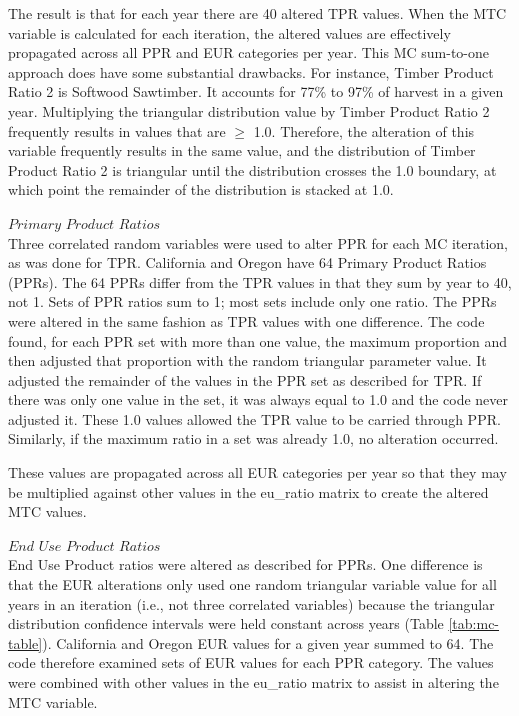 \documentclass[
  openany]{book}
\begin{document}
The result is that for each year there are 40 altered TPR values. When the MTC variable is calculated for each iteration, the altered values are effectively propagated across all PPR and EUR categories per year. This MC sum-to-one approach does have some substantial drawbacks. For instance, Timber Product Ratio 2 is Softwood Sawtimber. It accounts for 77\% to 97\% of harvest in a given year. Multiplying the triangular distribution value by Timber Product Ratio 2 frequently results in values that are \(\geq\) 1.0. Therefore, the alteration of this variable frequently results in the same value, and the distribution of Timber Product Ratio 2 is triangular until the distribution crosses the 1.0 boundary, at which point the remainder of the distribution is stacked at 1.0.

\(\textit{Primary Product Ratios}\)\\
Three correlated random variables were used to alter PPR for each MC iteration, as was done for TPR. California and Oregon have 64 Primary Product Ratios (PPRs). The 64 PPRs differ from the TPR values in that they sum by year to 40, not 1. Sets of PPR ratios sum to 1; most sets include only one ratio. The PPRs were altered in the same fashion as TPR values with one difference. The code found, for each PPR set with more than one value, the maximum proportion and then adjusted that proportion with the random triangular parameter value. It adjusted the remainder of the values in the PPR set as described for TPR. If there was only one value in the set, it was always equal to 1.0 and the code never adjusted it. These 1.0 values allowed the TPR value to be carried through PPR. Similarly, if the maximum ratio in a set was already 1.0, no alteration occurred.

These values are propagated across all EUR categories per year so that they may be multiplied against other values in the eu\_ratio matrix to create the altered MTC values.

\(\textit{End Use Product Ratios}\)\\
End Use Product ratios were altered as described for PPRs. One difference is that the EUR alterations only used one random triangular variable value for all years in an iteration (i.e., not three correlated variables) because the triangular distribution confidence intervals were held constant across years (Table \ref{tab:mc-table}). California and Oregon EUR values for a given year summed to 64. The code therefore examined sets of EUR values for each PPR category. The values were combined with other values in the eu\_ratio matrix to assist in altering the MTC variable.
\end{document}
